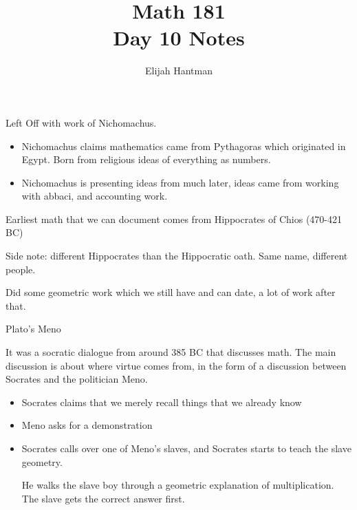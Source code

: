 \documentclass{report}
\title{\Huge{Math 181}\\Day 10 Notes}
\author{\huge{Elijah Hantman}}
\date{}
\begin{document}
\maketitle
\newpage

\begin{description}
    \item Left Off with work of Nichomachus. 
        \begin{mdframed}
            \begin{itemize}
                \item Nichomachus claims mathematics came
                    from Pythagoras which originated in
                    Egypt. Born from religious ideas
                    of everything as numbers.
                \item Nichomachus is presenting ideas
                    from much later, ideas came from
                    working with abbaci, and accounting
                    work.
            \end{itemize}
        \end{mdframed}
        \begin{mdframed}
            Earliest math that we can document comes from
            Hippocrates of Chios (470-421 BC)

            \begin{mdframed}
                Side note: different Hippocrates than the
                Hippocratic oath. Same name, different people.
            \end{mdframed}

            Did some geometric work which we still have and
            can date, a lot of work after that.
        \end{mdframed}
    \item {\large Plato's Meno}
        \begin{mdframed}
            It was a socratic dialogue from around 385 BC that
            discusses math. The main discussion is about
            where virtue comes from, in the form of a discussion
            between Socrates and the politician Meno.

            \begin{itemize}
                \item Socrates claims that we merely recall
                    things that we already know
                \item Meno asks for a demonstration
                \item Socrates calls over one of Meno's
                    slaves, and Socrates starts to teach
                    the slave geometry.
                    \begin{mdframed}
                        He walks the slave boy through
                        a geometric explanation of multiplication.
                        The slave gets the correct answer first.


\end{mdframed}
\end{itemize}
\end{mdframed}
\end{description}
\end{document}
